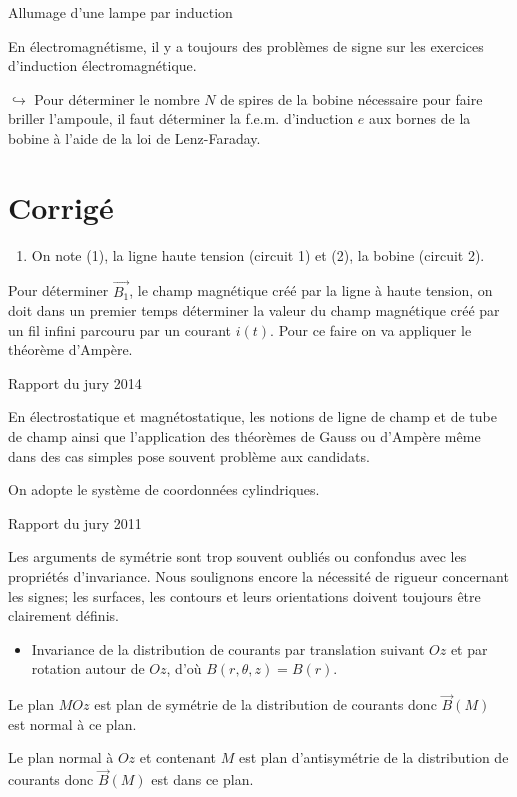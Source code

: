 \begin{exo}[PC][1][oral]{Allumage d'une lampe par induction}
{En électromagnétisme, il y a toujours des problèmes de signe sur les exercices d'induction électromagnétique.

$\hookrightarrow$ Pour déterminer le nombre $N$ de spires de la bobine nécessaire pour faire briller l'ampoule, il faut déterminer la f.e.m. d'induction $e$ aux bornes de la bobine à l'aide de la loi de Lenz-Faraday.

\section*{Corrigé}
\begin{enumerate}
  \item On note (1), la ligne haute tension (circuit 1) et (2), la bobine (circuit 2).
\end{enumerate}

Pour déterminer $\overrightarrow{B_{1}}$, le champ magnétique créé par la ligne à haute tension, on doit dans un premier temps déterminer la valeur du champ magnétique créé par un fil infini parcouru par un courant $i(t)$. Pour ce faire on va appliquer le théorème d'Ampère.

Rapport du jury 2014

En électrostatique et magnétostatique, les notions de ligne de champ et de tube de champ ainsi que l'application des théorèmes de Gauss ou d'Ampère même dans des cas simples pose souvent problème aux candidats.

On adopte le système de coordonnées cylindriques.

Rapport du jury 2011

Les arguments de symétrie sont trop souvent oubliés ou confondus avec les propriétés d'invariance. Nous soulignons encore la nécessité de rigueur concernant les signes; les surfaces, les contours et leurs orientations doivent toujours être clairement définis.

\begin{itemize}
  \item Invariance de la distribution de courants par translation suivant $O z$ et par rotation autour de $O z$, d'où $B(r, \theta, z)=B(r)$.
\end{itemize}

Le plan $M O z$ est plan de symétrie de la distribution de courants donc $\vec{B}(M)$ est normal à ce plan.

Le plan normal à $O z$ et contenant $M$ est plan d'antisymétrie de la distribution de courants donc $\vec{B}(M)$ est dans ce plan.

}
\end{exo}
